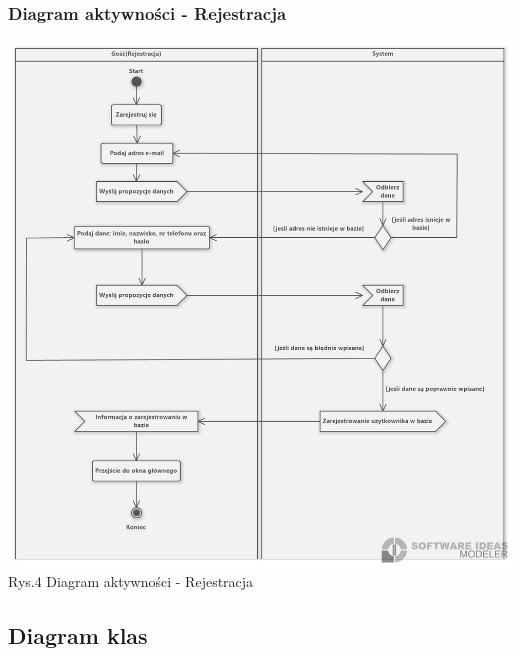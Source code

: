 \documentclass[12pt, letterpaper]{article}
\begin{document}
		\subsubsection{Diagram aktywności - Rejestracja}
		
		\begin{center}
			\includegraphics[scale=0.5]{acrejestracja}\\
			\caption{Rys.4 Diagram aktywności - Rejestracja}
		\end{center}
		
		\subsection{Diagram klas}
		
\end{document}
